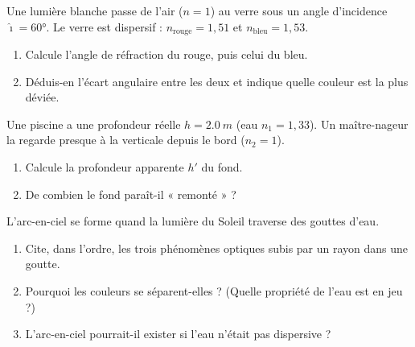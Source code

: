 \documentclass[11pt,a4paper]{article}
\begin{document}
\begin{exo}
Une lumière blanche passe de l'air ($n=1$) au verre sous un angle d'incidence $\hat{\imath}=\ang{60}$.
Le verre est dispersif : $n_{\text{rouge}}=1{,}51$ et $n_{\text{bleu}}=1{,}53$.
\begin{center}
\end{center}
\begin{enumerate}[label=\alph*)]
  \item Calcule l'angle de réfraction du rouge, puis celui du bleu.
  \item Déduis-en l'écart angulaire entre les deux et indique quelle couleur est la plus déviée.
\end{enumerate}
\end{exo}

\begin{exo}
Une piscine a une profondeur réelle $h=\qty{2.0}{m}$ (eau $n_1=1{,}33$). Un maître-nageur la regarde
presque à la verticale depuis le bord ($n_2=1$).
\begin{enumerate}[label=\alph*)]
  \item Calcule la profondeur apparente $h'$ du fond.
  \item De combien le fond paraît-il « remonté » ?
\end{enumerate}
\end{exo}

\begin{exo}
L'arc-en-ciel se forme quand la lumière du Soleil traverse des gouttes d'eau.
\begin{enumerate}[label=\alph*)]
  \item Cite, dans l'ordre, les trois phénomènes optiques subis par un rayon dans une goutte.
  \item Pourquoi les couleurs se séparent-elles ? (Quelle propriété de l'eau est en jeu ?)
  \item L'arc-en-ciel pourrait-il exister si l'eau n'était pas dispersive ?
\end{enumerate}
\end{exo}
\end{document}

